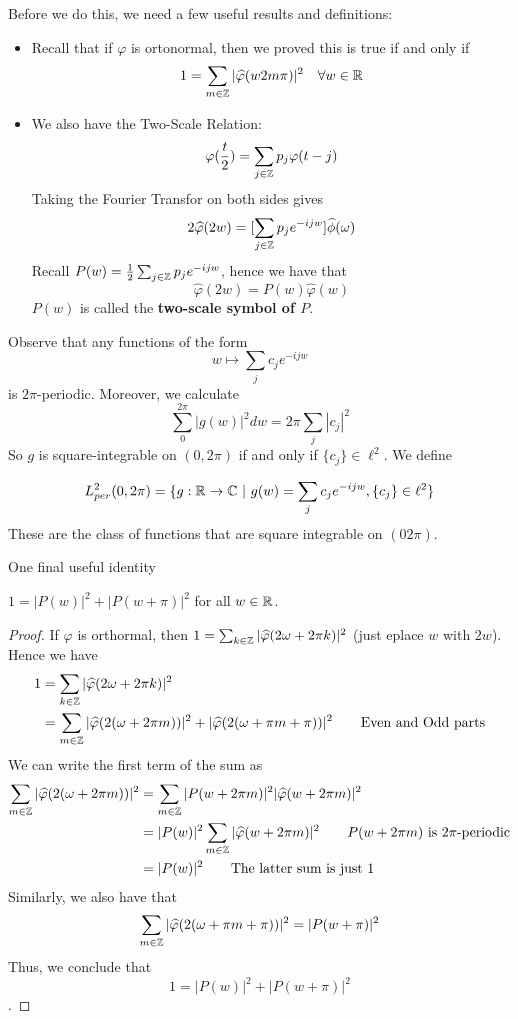 \documentclass{article}
\begin{document}
{Before we do this, we need a few useful results and definitions:

\begin{itemize}
    \item Recall that if $\varphi$ is ortonormal, then we proved this is true if and only if
\[1 = \sum_{m \in \mathbb{Z}} |\widehat{\varphi}(w 2 m \pi)|^2 \quad \forall w \in \mathbb{R}\]
    \item We also have the Two-Scale Relation:
    \[\varphi(\frac{t}{2}) = \sum_{j \in \mathbb{Z}} p_j \varphi(t - j)\]
    Taking the Fourier Transfor on both sides gives
    \[2 \widehat{\varphi}(2w) = [\sum_{j \in \mathbb{Z}} p_j e^{-ijw}] \widehat{\phi}(\omega)\]
    Recall $P(w) = \frac{1}{2}\sum_{j \in \mathbb{Z}} p_j e^{-ijw}$, hence we have that
    \[\widehat{\varphi}(2w) = P(w) \widehat{\varphi}(w)\]
    $P(w)$ is called the \textbf{two-scale symbol of $P$}.
\end{itemize}

Observe that any functions of the form
\[w \mapsto \sum_j c_j e^{-ijw}\]
is $2\pi$-periodic. Moreover, we calculate
\[\sum_0^{2\pi} |g(w)|^2 dw = 2\pi \sum_j |c_j|^2\]
So $g$ is square-integrable on $(0, 2\pi)$ if and only if $\{c_j\} \in \ell^2$. We define

\begin{definition}
    \[L^2_{per}(0, 2\pi) = \{g: \Rbb \to \Cbb\ |\ g(w) = \sum_j c_j e^{-ijw}, \{c_j\} \in \ell^2\}\]
    These are the class of functions that are square integrable on $(0 2\pi)$.
\end{definition}

One final useful identity
\begin{proposition}
$1 = |P(w)|^2 + |P(w + \pi)|^2$ for all $w \in \mathbb{R}$.
\end{proposition}

\begin{proof}
    If $\varphi$ is orthormal, then $1 = \sum_{k \in \mathbb{Z}} |\widehat{\varphi}(2\omega + 2\pi k)|^2$ (just eplace $w$ with $2w$). Hence we have
    \begin{align*}
        1 &= \sum_{k \in \mathbb{Z}} |\widehat{\varphi}(2\omega + 2\pi k)|^2\\
        &= \sum_{m \in \mathbb{Z}} |\widehat{\varphi}(2(\omega + 2\pi m))|^2 + |\widehat{\varphi}(2(\omega + \pi m + \pi))|^2 \tag*{Even and Odd parts}
    \end{align*}
    We can write the first term of the sum as
    \begin{align*}
        \sum_{m \in \mathbb{Z}} |\widehat{\varphi}(2(\omega + 2\pi m))|^2 &= \sum_{m \in \mathbb{Z}} |P(w + 2\pi m)|^2 |\widehat{\varphi}(w + 2\pi m)|^2\\
        &= |P(w)|^2 \sum_{m \in \mathbb{Z}} |\widehat{\varphi}(w + 2\pi m)|^2 \tag*{$P(w + 2\pi m)$ is $2\pi$-periodic}\\
        &= |P(w)|^2 \tag*{The latter sum is just $1$}
    \end{align*}
    Similarly, we also have that
    \[\sum_{m \in \mathbb{Z}} |\widehat{\varphi}(2(\omega + \pi m + \pi))|^2  = |P(w+\pi)|^2\]
    Thus, we conclude that$$1 = |P(w)|^2 + |P(w + \pi)|^2$$.
\end{proof}

}
\end{document}
